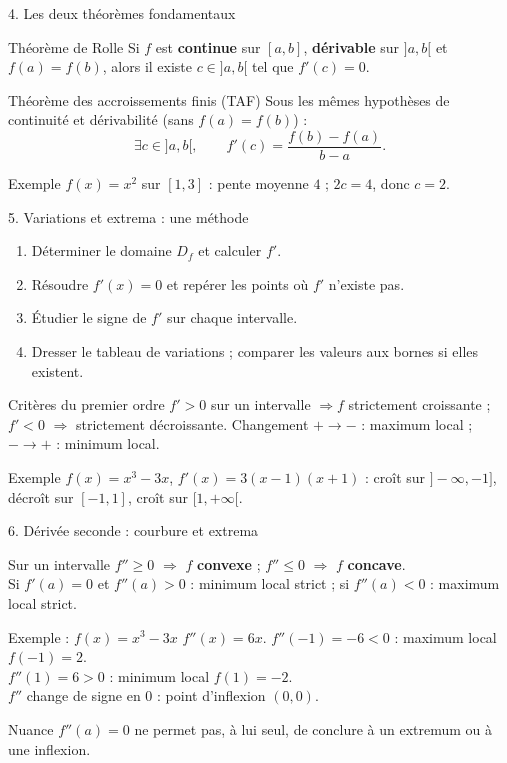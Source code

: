 \documentclass[aspectratio=169,11pt]{beamer}
\begin{document}
\begin{frame}{4. Les deux théorèmes fondamentaux}
\begin{block}{Théorème de Rolle}
Si $f$ est \textbf{continue} sur $[a,b]$, \textbf{dérivable} sur $]a,b[$ et $f(a)=f(b)$, alors il existe $c\in]a,b[$ tel que $f'(c)=0$.
\end{block}
\begin{block}{Théorème des accroissements finis (TAF)}
Sous les mêmes hypothèses de continuité et dérivabilité (sans $f(a)=f(b)$) :
\[\exists c\in]a,b[,\qquad f'(c)=\frac{f(b)-f(a)}{b-a}.\]
\end{block}
\begin{exampleblock}{Exemple}
$f(x)=x^2$ sur $[1,3]$ : pente moyenne $4$ ; $2c=4$, donc $c=2$.
\end{exampleblock}
\end{frame}

\begin{frame}{5. Variations et extrema : une méthode}
\begin{enumerate}
\item Déterminer le domaine $D_f$ et calculer $f'$.
\item Résoudre $f'(x)=0$ et repérer les points où $f'$ n'existe pas.
\item Étudier le signe de $f'$ sur chaque intervalle.
\item Dresser le tableau de variations ; comparer les valeurs aux bornes si elles existent.
\end{enumerate}
\begin{block}{Critères du premier ordre}
$f'>0$ sur un intervalle $\Rightarrow f$ strictement croissante ; $f'<0$ $\Rightarrow$ strictement décroissante. Changement $+\to-$ : maximum local ; $-\to+$ : minimum local.
\end{block}
\begin{exampleblock}{Exemple}
$f(x)=x^3-3x$, $f'(x)=3(x-1)(x+1)$ : croît sur $]-\infty,-1]$, décroît sur $[-1,1]$, croît sur $[1,+\infty[$.
\end{exampleblock}
\end{frame}

\begin{frame}{6. Dérivée seconde : courbure et extrema}
\begin{block}{Sur un intervalle}
$f''\ge0$ $\Rightarrow$ $f$ \textbf{convexe} ; $f''\le0$ $\Rightarrow$ $f$ \textbf{concave}.\\
Si $f'(a)=0$ et $f''(a)>0$ : minimum local strict ; si $f''(a)<0$ : maximum local strict.
\end{block}
\begin{exampleblock}{Exemple : $f(x)=x^3-3x$}
$f''(x)=6x$. $f''(-1)=-6<0$ : maximum local $f(-1)=2$.\\
$f''(1)=6>0$ : minimum local $f(1)=-2$.\\
$f''$ change de signe en $0$ : point d'inflexion $(0,0)$.
\end{exampleblock}
\begin{alertblock}{Nuance}
$f''(a)=0$ ne permet pas, à lui seul, de conclure à un extremum ou à une inflexion.
\end{alertblock}
\end{frame}
\end{document}
